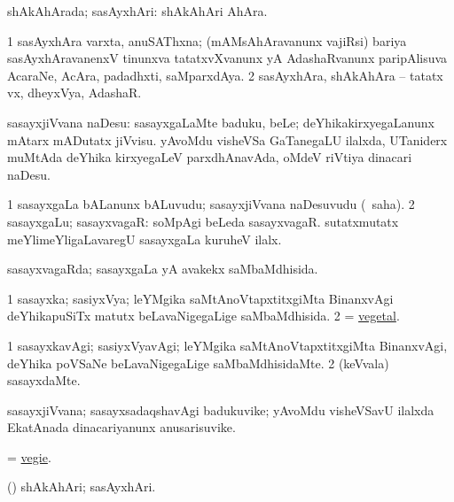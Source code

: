 \bentry
{} 
\gl{\gu}
\expl{}
\bmng
 shAkAhArada; sasAyxhAri:  shAkAhAri AhAra. 
\emng
\eentry

\bentry
{} 
\gl{\nA}
\expl{}
\bmng
\bnum
\num{1} sasAyxhAra varxta, anuSAThxna; (mAMsAhAravanunx vajiRsi) bariya sasAyxhAravanenxV tinunxva tatatxvXvanunx yA AdashaRvanunx paripAlisuva AcaraNe, AcAra, padadhxti, saMparxdAya. 
\num{2} sasAyxhAra, shAkAhAra -- tatatx vx, dheyxVya, AdashaR. 
\enum
\emng
\eentry

\bentry
{} 
\gl{\akirx}
\expl{}
\bmng
 sasayxjiVvana naDesu: 
\banum
{} sasayxgaLaMte baduku, beLe; deYhikakirxyegaLanunx mAtarx mADutatx jiVvisu. 
 yAvoMdu visheVSa GaTanegaLU ilalxda, UTaniderx muMtAda deYhika kirxyegaLeV parxdhAnavAda, oMdeV riVtiya dinacari naDesu. 
\eanum
\emng
\eentry

\bentry
{} 
\gl{\nA}
\expl{}
\bmng
\bnum
\num{1} sasayxgaLa bALanunx bALuvudu; sasayxjiVvana naDesuvudu (\rUpa\ saha). 
\num{2} sasayxgaLu; sasayxvagaR:  soMpAgi beLeda sasayxvagaR.  sutatxmutatx meYlimeYligaLavaregU sasayxgaLa kuruheV ilalx. 
\enum
\emng
\eentry

\bentry
{} 
\gl{\gu}
\expl{}
\bmng
 sasayxvagaRda; sasayxgaLa yA avakekx saMbaMdhisida. 
\emng
\eentry

\bentry
{} 
\gl{\gu}
\expl{}
\bmng
\bnum
\num{1} sasayxka; sasiyxVya; leYMgika saMtAnoVtapxtitxgiMta BinanxvAgi deYhikapuSiTx matutx beLavaNigegaLige saMbaMdhisida. 
\num{2} = \hyperlink{vegetal}{vegetal}. 
\enum
\emng
\eentry

\bentry
{} 
\gl{\kirxvi}
\expl{}
\bmng
\bnum
\num{1} sasayxkavAgi; sasiyxVyavAgi; leYMgika saMtAnoVtapxtitxgiMta BinanxvAgi, deYhika poVSaNe beLavaNigegaLige saMbaMdhisidaMte. 
\num{2} (keVvala) sasayxdaMte. 
\enum
\emng
\eentry

\bentry
{} 
\gl{\nA}
\expl{}
\bmng
 sasayxjiVvana; sasayxsadaqshavAgi badukuvike; yAvoMdu visheVSavU ilalxda EkatAnada dinacariyanunx anusarisuvike. 
\emng
\eentry

\bentry
{} 
\gl{\nA}
\expl{}
\bmng
 = \hyperlink{vegie}{vegie}. 
\emng
\eentry

\bentry
{} 
\gl{\nA}
\expl{}
\bmng
 (\AmA) shAkAhAri; sasAyxhAri. 
\emng
\eentry

